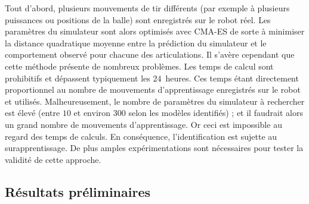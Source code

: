 Tout d'abord, plusieurs mouvements de tir différents 
(par exemple à plusieurs puissances ou positions de la balle) sont 
enregistrés sur le robot réel.
Les paramètres du simulateur sont alors optimisés avec CMA-ES de sorte à minimiser 
la distance quadratique moyenne entre la prédiction du simulateur et
le comportement observé pour chacune des articulations.
Il s'avère cependant que cette méthode présente de nombreux problèmes.
Les temps de calcul sont prohibitifs et dépassent typiquement les $24$~heures.
Ces temps étant directement proportionnel au nombre de mouvements d'apprentissage
enregistrés sur le robot et utilisés.
Malheureusement, le nombre de paramètres du simulateur à rechercher est élevé 
(entre $10$ et environ $300$ selon les modèles identifiés) ;
et il faudrait alors un grand nombre de mouvements d'apprentissage.
Or ceci est impossible au regard des temps de calculs.
En conséquence, l'identification est sujette au surapprentissage.
De plus amples expérimentations sont nécessaires pour tester la validité
de cette approche.

\subsection{Résultats préliminaires\label{sec:motion_results}}

